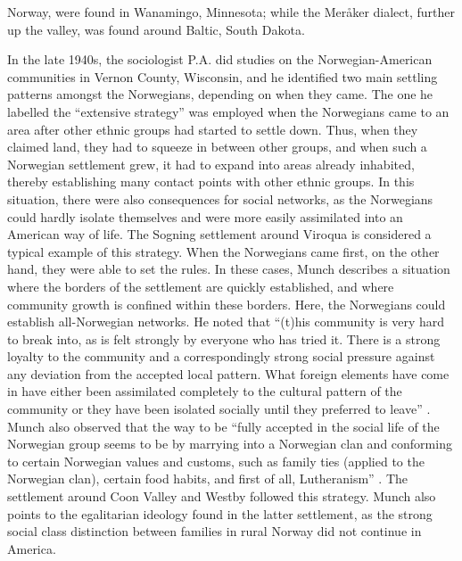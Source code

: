 \documentclass[output=paper]{langscibook}
\begin{document}
Norway, were found in Wanamingo, Minnesota; while the Meråker dialect, further up the valley, was found around Baltic, South Dakota.   

In the late 1940s, the sociologist P.A. \citet{Munch1949, Munch1954} did studies on the Norwegian\hyp American communities in Vernon County, Wisconsin, and he identified two main settling patterns amongst the Norwegians, depending on when they came. The one he labelled the “extensive strategy” was employed when the Norwegians came to an area after other ethnic groups had started to settle down. Thus, when they claimed land, they had to squeeze in between other groups, and when such a Norwegian settlement grew, it had to expand into areas already inhabited, thereby establishing many contact points with other ethnic groups. In this situation, there were also consequences for social networks, as the Norwegians could hardly isolate themselves and were more easily assimilated into an American way of life. The Sogning settlement around Viroqua is considered a typical example of this strategy. When the Norwegians came first, on the other hand, they were able to set the rules. In these cases, Munch describes a situation where the borders of the settlement are quickly established, and where community growth is confined within these borders. Here, the Norwegians could establish all-Norwegian networks. He noted that “(t)his community is very hard to break into, as is felt strongly by everyone who has tried it. There is a strong loyalty to the community and a correspondingly strong social pressure against any deviation from the accepted local pattern. What foreign elements have come in have either been assimilated completely to the cultural pattern of the community or they have been isolated socially until they preferred to leave” \citep[784]{Munch1949}. Munch also observed that the way to be “fully accepted in the social life of the Norwegian group seems to be by marrying into a Norwegian clan and conforming to certain Norwegian values and customs, such as family ties (applied to the Norwegian clan), certain food habits, and first of all, Lutheranism” \citep[786]{Munch1949}. The settlement around Coon Valley and Westby followed this strategy. Munch also points to the egalitarian ideology found in the latter settlement, as the strong social class distinction between families in rural Norway did not continue in America. 
\end{document}
